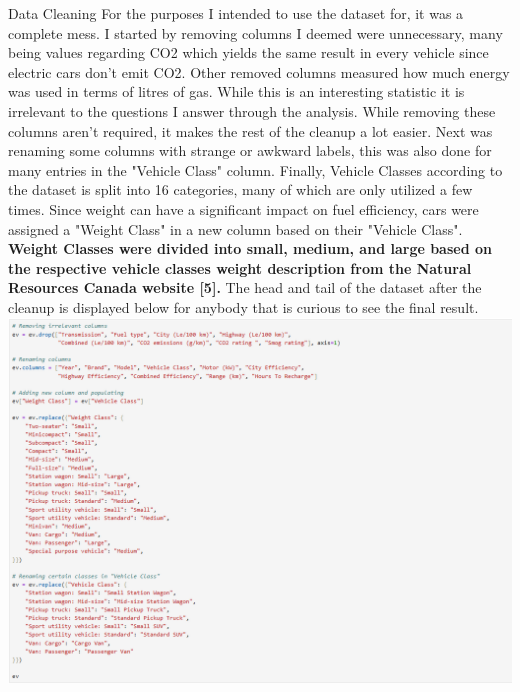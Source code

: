 \documentclass{article}
\begin{document}
{  \newline \newline
  \Large Data Cleaning
  \newline \newline
  \normalsize For the purposes I intended to use the dataset for, it was a complete mess. I started by removing columns I
  deemed were unnecessary, many being values regarding CO2 which yields the same result in every vehicle since electric cars
  don't emit CO2. Other removed columns measured how much energy was used in terms of litres of gas. While this is an
  interesting statistic it is irrelevant to the questions I answer through the analysis. While removing these columns aren't
  required, it makes the rest of the cleanup a lot easier. Next was renaming some columns with strange or awkward labels,
  this was also done for many entries in the "Vehicle Class" column.
  \newline \newline
  Finally, Vehicle Classes according to the dataset is split into 16 categories, many of which are only utilized a few times.
  Since weight can have a significant impact on fuel efficiency, cars were assigned a "Weight Class" in a new column based on
  their "Vehicle Class".
  \newline \newline
  \textbf{Weight Classes were divided into small, medium, and large based on the respective vehicle classes weight description
  from the Natural Resources Canada website [5].}
  \newline \newline
  The head and tail of the dataset after the cleanup is displayed below for anybody that is curious to see the final result.
  \includegraphics[width=\textwidth]{code_02.png}
}
\end{document}
